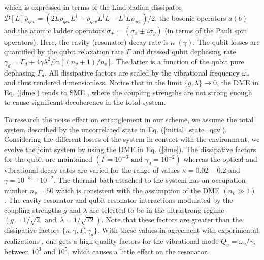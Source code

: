 which is expressed in terms of the Lindbladian dissipator $\mathcal{D}[L]\rho_{qcv} = (2 L \rho_{qcv} L^{\dagger}- \rho_{qcv}L^{\dagger}L- L^{\dagger}L\rho_{qcv})/2$, the bosonic operators $a(b)$ and the atomic ladder operators $\sigma_{\pm}=\left(\sigma_{x} \pm i \sigma_{y}\right)$ (in terms of the Pauli spin operators). Here, the cavity (resonator) decay rate is $\kappa\,\, (\gamma)$. The qubit losses are quantified by the qubit relaxation rate $\Gamma$ and dressed qubit dephasing rate $\gamma_{d}=\Gamma_{d} + 4\gamma \lambda^{2}/\textrm{ln}\left[(n_{v}+1)/n_{v}\right]$. The latter is a function of the qubit pure dephasing $\Gamma_{d}$. All dissipative factors are scaled by the vibrational frequency $\omega_{v}$ and thus rendered dimensionless. Notice that in the limit $\{g, \lambda\}\rightarrow 0$, the DME in Eq. (\ref{dme}) tends to SME \cite{naseem2018thermodynamic}, where the coupling strengths are not strong enough to cause significant decoherence in the total system.

To research the noise effect on entanglement in our scheme, we assume the total system described by the uncorrelated state in Eq. (\ref{initial_state_qcv}). Considering the different losses of the system in contact with the environment, we evolve the joint system by using the DME in Eq. (\ref{dme}). The dissipative factors for the qubit are maintained $(\Gamma = 10^{-3}\,\, \text{and}\,\,\gamma_{d}=10^{-2})$ whereas the optical and vibrational decay rates are varied for the range of values $\kappa=0.02-0.2$ and $\gamma=10^{-5}-10^{-2}$. The thermal bath attached to the system has an occupation number $n_{v}=50$ which is consistent with the assumption of the DME $(n_{v} \gg 1)$ \cite{naseem2018thermodynamic}. The cavity-resonator and qubit-resonator interactions modulated by the coupling strengths $g$ and $\lambda$ are selected to be in the ultrastrong regime $(g=1/\sqrt{2} \,\,\, \text{and} \,\,\, \lambda=1/\sqrt{72})$. Note that these factors are greater than the dissipative factors $\{\kappa, \gamma, \Gamma, \gamma_{d} \}$. With these values in agreement with experimental realizations \cite{aspelmeyer2014cavity}, one gets a high-quality factors for the vibrational mode $Q_{v}=\omega_{v}/\gamma$, between $10^{3}$ and $10^{5}$, which causes a little effect on the resonator.

